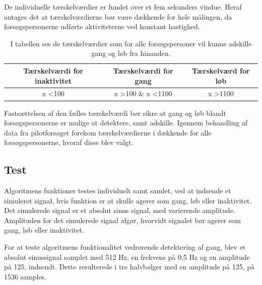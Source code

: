 De individuelle tærskelværdier er fundet over et fem sekunders vindue. Heraf antages det at tærskelværdierne bør være dækkende for hele målingen, da forsøgspersonerne udførte aktiviteterne ved konstant hastighed.   

\begin{table}[H]
	\centering
	\begin{tabular}{ccc}
		\hline
		\rowcolor[HTML]{C0C0C0} 
		Tærskelværdi for inaktivitet & Tærskelværdi for gang & Tærskelværd for løb \\ \hline
		x \textless 100 & x \textgreater 100 \& x \textless 1100 & x \textgreater 1100 \\ \hline
	\end{tabular}
	\caption{I tabellen ses de tærskelværdier som for alle forsøgspersoner vil kunne adskille gang og løb fra hinanden.}
	\label{tab:faelles_taerskel}
\end{table}

Fastsættelsen af den fælles tærskelværdi bør sikre at gang og løb blandt forsøgspersonerne er mulige at detektere, samt adskille. Igennem behandling af data fra pilotforsøget forekom tærskelværdierne i  dækkende for alle forsøgspersonerne, hvoraf disse blev valgt.


\subsection{Test}
Algoritmens funktioner testes individuelt samt samlet, ved at indsende et simuleret signal, hvis funktion er at skulle agerer som gang, løb eller inaktivitet. Det simulerede signal er et absolut sinus signal, med varierende amplitude. Amplituden for det simulerede signal afgør, hvorvidt signalet bør agerer som gang, løb eller inaktivitet.  

For at teste algoritmens funktionalitet vedrørende detektering af gang, blev et absolut sinussignal samplet med 512 Hz, en frekvens på 0,5 Hz og en amplitude på 125, indsendt. Dette resulterede i tre halvbølger med en amplitude på 125, på 1536 samples. 

